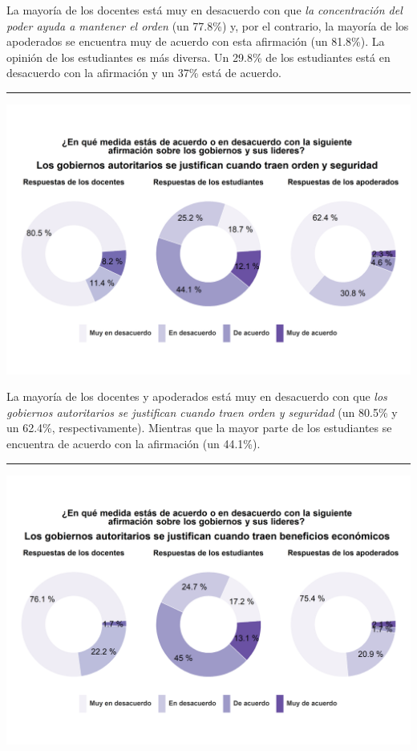 \documentclass[
  14pt,
]{book}
\let\origfigure\figure
\let\endorigfigure\endfigure
\renewenvironment{figure}[1][2] {
  \expandafter\origfigure\expandafter[H]
} {
  \endorigfigure
}
\begin{document}
La mayoría de los docentes está muy en desacuerdo con que \emph{la concentración del poder ayuda a mantener el orden} (un 77.8\%) y, por el contrario, la mayoría de los apoderados se encuentra muy de acuerdo con esta afirmación (un 81.8\%). La opinión de los estudiantes es más diversa. Un 29.8\% de los estudiantes está en desacuerdo con la afirmación y un 37\% está de acuerdo.

\begin{center}\rule{0.5\linewidth}{0.5pt}\end{center}

\begin{figure}[!ht]

{\centering \includegraphics[width=0.8\linewidth,]{images/graph_aut8} 

}

\caption{El orden y la seguridad justifican los gobiernos autoritarios}\label{fig:unnamed-chunk-49}
\end{figure}

La mayoría de los docentes y apoderados está muy en desacuerdo con que \emph{los gobiernos autoritarios se justifican cuando traen orden y seguridad} (un 80.5\% y un 62.4\%, respectivamente). Mientras que la mayor parte de los estudiantes se encuentra de acuerdo con la afirmación (un 44.1\%).

\begin{center}\rule{0.5\linewidth}{0.5pt}\end{center}

\begin{figure}[!ht]

{\centering \includegraphics[width=0.8\linewidth,]{images/graph_aut9} 

}

\caption{Los beneficios económicos justifican los gobiernos autoritarios}\label{fig:unnamed-chunk-50}
\end{figure}
\end{document}
